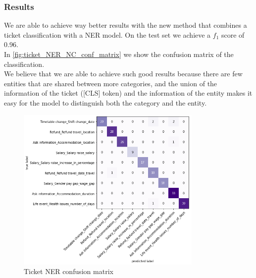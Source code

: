 \subsubsection*{Results}
We are able to achieve way better results with the new method that combines a ticket classification with a NER model. On the test set we achieve a $f_1$ score of 0.96. \\
In \autoref{fig:ticket_NER_NC_conf_matrix} we show the confusion matrix of the classification. \\
We believe that we are able to achieve such good results because there are few entities that are shared between more categories, and the union of the information of the ticket ([CLS] token) and the information of the entity makes it easy for the model to distinguish both the category and the entity.
\begin{figure}[h] 
    \centering
    \includegraphics[width=0.8\textwidth]{images/conf_matrix_ner_nc.png}
    \caption{Ticket NER confusion matrix}
    \label{fig:ticket_NER_NC_conf_matrix}
\end{figure}   
